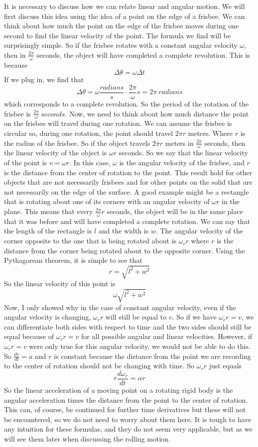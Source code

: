 It is necessary to discuss how we can relate linear and angular motion. We will first discuss this idea using the idea of a point on the edge of a frisbee. We can think about how much the point on the edge of the frisbee moves during one second to find the linear velocity of the point. The formula we find will be surprisingly simple. So if the frisbee rotates with a constant angular velocity $\omega$, then in $\frac{2\pi}{\omega}$ seconds, the object will have completed a complete revolution. This is because $$\Delta \theta=\omega \Delta t$$ If we plug in, we find that $$\Delta \theta=\omega \frac{radians}{s} \cdot \frac{2\pi}{\omega}s=2\pi \ radians$$ which corresponds to a complete revolution. So the period of the rotation of the frisbee is $\frac{2\pi}{\omega} \ seconds$. Now, we need to think about how much distance the point on the frisbee will travel during one rotation. We can assume the frisbee is circular so, during one rotation, the point should travel $2\pi r$ meters. Where $r$ is the radius of the frisbee. So if the object travels $2\pi r$ meters in $\frac{2\pi}{\omega}$ seconds, then the linear velocity of the object is $\omega r$ seconds. So we say that the linear velocity of the point is $v=\omega r$. In this case, $\omega$ is the angular velocity of the frisbee, and $r$ is the distance from the center of rotation to the point. This result hold for other objects that are not necessarily frisbees and for other points on the solid that are not necessarily on the edge of the surface. A good example might be a rectangle that is rotating about one of its corners with an angular velocity of $\omega r$ in the plane. This means that every $\frac{2\pi}{\omega}r$ seconds, the object will be in the same place that it was before and will have completed a complete rotation. We can say that the length of the rectangle is $l$ and the width is $w$. The angular velocity of the corner opposite to the one that is being rotated about is $\omega_r r$ where $r$ is the distance from the corner being rotated about to the opposite corner. Using the Pythagorean theorem, it is simple to see that $$r=\sqrt{l^2+w^2}$$ So the linear velocity of this point is $$\omega \sqrt{l^2+w^2}$$ Now, I only showed why in the case of constant angular velocity, even if the angular velocity is changing, $\omega_r r$ will still be equal to $v$. So if we have $\omega_r r=v$, we can differentiate both sides with respect to time and the two sides should still be equal because of $\omega_r r=v$ for all possible angular and linear velocities. However, if $\omega_r r=v$ were only true for this angular velocity, we would not be able to do this. So $\frac{dv}{dt}=a$ and $r$ is constant because the distance from the point we are recording to the center of rotation should not be changing with time. So $\omega_r r$ just equals $$r\frac{d\omega_r}{dt}=\alpha r$$ So the linear acceleration of a moving point on a rotating rigid body is the angular acceleration times the distance from the point to the center of rotation. This can, of course, be continued for further time derivatives but these will not be encountered, so we do not need to worry about them here. It is tough to have any intuition for these formulas, and they do not seem very applicable, but as we will see them later when discussing the rolling motion. 